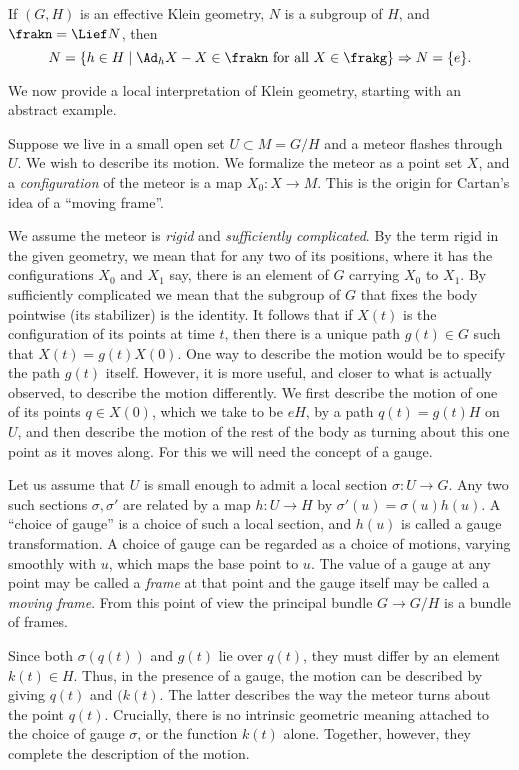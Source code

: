 \begin{cor}\label{Cor 4.2 Sharpe}
    If $(G,H)$ is an effective Klein geometry, $N$ is a subgroup of $H$, and $\frakn=\Lief N$, then
    \[N=\{h\in H\mid \Ad_h X-X\in\frakn \text{ for all }X\in\frakg\}\Rightarrow N=\{e\}.\]
\end{cor}

We now provide a local interpretation of Klein geometry, starting with an abstract example.

\begin{example}
    Suppose we live in a small open set $U\subset M=G\slash H$ and a meteor flashes through $U$. We wish to describe its motion. We formalize the meteor as a point set $X$, and a \emph{configuration} of the meteor is a map $X_0:X\to M$. This is the origin for Cartan's idea of a ``moving frame''.
    
    We assume the meteor is \emph{rigid} and \emph{sufficiently complicated}. By the term rigid in the given geometry, we mean that for any two of its positions, where it has the configurations $X_0$ and $X_1$ say, there is an element of $G$ carrying $X_0$ to $X_1$. By sufficiently complicated we mean that the subgroup of $G$ that fixes the body pointwise (its stabilizer) is the identity.  It follows that if $X(t)$ is the configuration of its points at time $t$, then there is a unique path $g(t)\in G$ such that $X(t)=g(t)X(0)$. One way to describe the motion would be to specify the path $g(t)$ itself. However, it is more useful, and closer to what is actually observed, to describe the motion differently. We first describe the motion of one of its points $q\in X(0)$, which we take to be $eH$, by a path $q(t)=g(t)H$ on $U$, and then describe the motion of the rest of the body as turning about this one point as it moves along. For this we will need the concept of a gauge.

    Let us assume that $U$ is small enough to admit a local section $\sigma:U\to G$. Any two such sections $\sigma,\sigma'$ are related by a map $h:U\to H$ by $\sigma'(u)=\sigma(u)h(u)$. A ``choice of gauge'' is a choice of such a local section, and $h(u)$ is called a gauge transformation. A choice of gauge can be regarded as a choice of motions, varying smoothly with $u$, which maps the base point to $u$. The value of a gauge at any point may be called a \emph{frame} at that point and the gauge itself may be called a \emph{moving frame}. From this point of view the principal bundle $G\to G\slash H$ is a bundle of frames.

    Since both $\sigma(q(t))$ and $g(t)$ lie over $q(t)$, they must differ by an element $k(t)\in H$. Thus, in the presence of a gauge, the motion can be described by giving $q(t)$ and $(k(t)$. The latter describes the way the meteor turns about the point $q(t)$. Crucially, there is no intrinsic geometric meaning attached to the choice of gauge $\sigma$, or the function $k(t)$ alone. Together, however, they complete the description of the motion.
\end{example}


